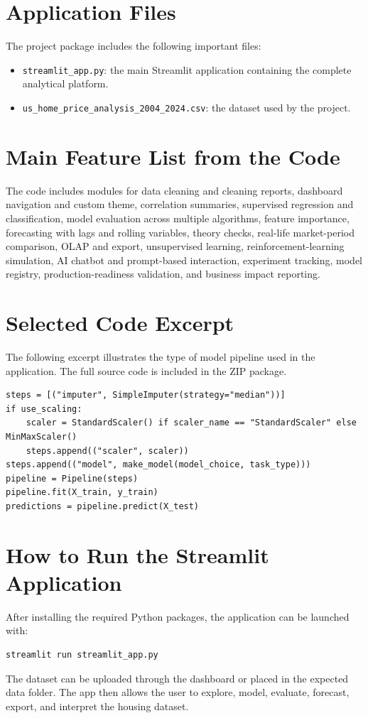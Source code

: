 
\section{Application Files}

The project package includes the following important files:
\begin{itemize}
\item \texttt{streamlit\_app.py}: the main Streamlit application containing the complete analytical platform.
\item \texttt{us\_home\_price\_analysis\_2004\_2024.csv}: the dataset used by the project.
\end{itemize}

\section{Main Feature List from the Code}

The code includes modules for data cleaning and cleaning reports, dashboard navigation and custom theme, correlation summaries, supervised regression and classification, model evaluation across multiple algorithms, feature importance, forecasting with lags and rolling variables, theory checks, real-life market-period comparison, OLAP and export, unsupervised learning, reinforcement-learning simulation, AI chatbot and prompt-based interaction, experiment tracking, model registry, production-readiness validation, and business impact reporting.

\section{Selected Code Excerpt}

The following excerpt illustrates the type of model pipeline used in the application. The full source code is included in the ZIP package.

\begin{verbatim}
steps = [("imputer", SimpleImputer(strategy="median"))]
if use_scaling:
    scaler = StandardScaler() if scaler_name == "StandardScaler" else MinMaxScaler()
    steps.append(("scaler", scaler))
steps.append(("model", make_model(model_choice, task_type)))
pipeline = Pipeline(steps)
pipeline.fit(X_train, y_train)
predictions = pipeline.predict(X_test)
\end{verbatim}

\section{How to Run the Streamlit Application}

After installing the required Python packages, the application can be launched with:
\begin{verbatim}
streamlit run streamlit_app.py
\end{verbatim}

The dataset can be uploaded through the dashboard or placed in the expected data folder. The app then allows the user to explore, model, evaluate, forecast, export, and interpret the housing dataset.
